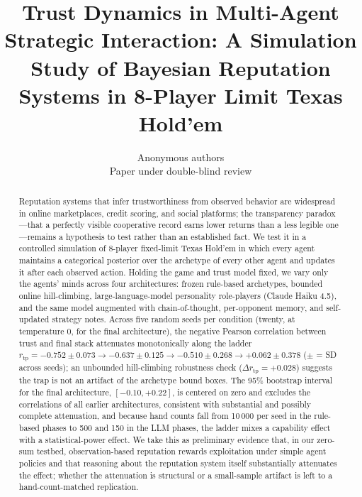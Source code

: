 \documentclass[10pt]{article} %
\title{Trust Dynamics in Multi-Agent Strategic Interaction:
  A Simulation Study of Bayesian Reputation Systems in
  8-Player Limit Texas Hold'em}
\author{Anonymous authors\\Paper under double-blind review}
\newcommand{\rtp}{\ensuremath{r_{\mathrm{tp}}}}
\begin{document}
\maketitle

\begin{abstract}
Reputation systems that infer trustworthiness from observed
      behavior are widespread in online marketplaces, credit scoring,
      and social platforms; the transparency paradox---that a
      perfectly visible cooperative record earns lower returns than a
      less legible one---remains a hypothesis to test rather than an
      established fact. We test it in a controlled simulation of
      8-player fixed-limit Texas Hold'em in which every agent
      maintains a categorical posterior over the archetype of every
      other agent and updates it after each observed action. Holding
      the game and trust model fixed, we vary only the agents' minds
      across four architectures: frozen rule-based archetypes,
      bounded online hill-climbing, large-language-model personality
      role-players (Claude Haiku 4.5), and the same model augmented
      with chain-of-thought, per-opponent memory, and self-updated
      strategy notes. Across five random seeds per condition (twenty, at temperature 0, for the final architecture), the negative Pearson correlation between trust and final stack attenuates monotonically along the ladder $\rtp = -0.752 \pm 0.073 \rightarrow -0.637 \pm 0.125 \rightarrow -0.510 \pm 0.268 \rightarrow +0.062 \pm 0.378$ ($\pm$ = SD across seeds); an unbounded hill-climbing robustness check
      ($\Delta\rtp = +0.028$) suggests the trap is not an artifact
      of the archetype bound boxes. The 95\% bootstrap interval for the final architecture, $[-0.10, +0.22]$, is centered on zero and excludes the correlations of all earlier architectures, consistent with substantial and possibly complete attenuation, and
      because hand counts fall from 10\,000 per seed in the
      rule-based phases to 500 and 150 in the LLM phases, the ladder
      mixes a capability effect with a statistical-power effect. We
      take this as preliminary evidence that, in our zero-sum
      testbed, observation-based reputation rewards exploitation
      under simple agent policies and that reasoning about the
      reputation system itself substantially attenuates the effect;
      whether the attenuation is structural or a small-sample
      artifact is left to a hand-count-matched replication.
\end{abstract}
\end{document}
